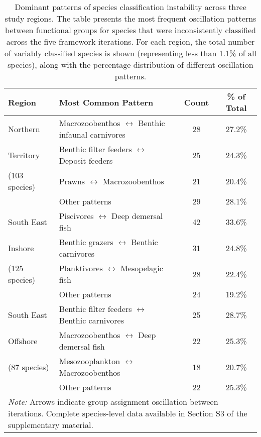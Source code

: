 \begin{table}[htbp]
\centering
\caption{Dominant patterns of species classification instability across three study regions. The table presents the most frequent oscillation patterns between functional groups for species that were inconsistently classified across the five framework iterations. For each region, the total number of variably classified species is shown (representing less than 1.1\% of all species), along with the percentage distribution of different oscillation patterns.}
\label{tab:unstable_species}
\small
\begin{tabular}{llcc}
\hline
Region & Most Common Pattern & Count & \% of Total \\
\hline
Northern & Macrozoobenthos $\leftrightarrow$ Benthic infaunal carnivores & 28 & 27.2\% \\
Territory & Benthic filter feeders $\leftrightarrow$ Deposit feeders & 25 & 24.3\% \\
(103 species) & Prawns $\leftrightarrow$ Macrozoobenthos & 21 & 20.4\% \\
& Other patterns & 29 & 28.1\% \\
\hline
South East & Piscivores $\leftrightarrow$ Deep demersal fish & 42 & 33.6\% \\
Inshore & Benthic grazers $\leftrightarrow$ Benthic carnivores & 31 & 24.8\% \\
(125 species) & Planktivores $\leftrightarrow$ Mesopelagic fish & 28 & 22.4\% \\
& Other patterns & 24 & 19.2\% \\
\hline
South East & Benthic filter feeders $\leftrightarrow$ Benthic carnivores & 25 & 28.7\% \\
Offshore & Macrozoobenthos $\leftrightarrow$ Deep demersal fish & 22 & 25.3\% \\
(87 species) & Mesozooplankton $\leftrightarrow$ Macrozoobenthos & 18 & 20.7\% \\
& Other patterns & 22 & 25.3\% \\
\hline
\multicolumn{4}{p{0.95\textwidth}}{\small \textit{Note:} Arrows indicate group assignment oscillation between iterations. Complete species-level data available in Section S3 of the supplementary material.} \\
\hline
\end{tabular}
\end{table}
